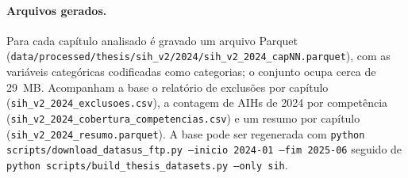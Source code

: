 \paragraph{Arquivos gerados.}
Para cada capítulo analisado é gravado um arquivo Parquet
(\texttt{data/processed/thesis/sih\_v2/2024/sih\_v2\_2024\_capNN.parquet}), com as
variáveis categóricas codificadas como categorias; o conjunto ocupa cerca de
29~MB. Acompanham a base o relatório de exclusões por capítulo
(\texttt{sih\_v2\_2024\_exclusoes.csv}), a contagem de AIHs de 2024 por
competência (\texttt{sih\_v2\_2024\_cobertura\_competencias.csv}) e um resumo por
capítulo (\texttt{sih\_v2\_2024\_resumo.parquet}). A base pode ser regenerada com
\texttt{python scripts/download\_datasus\_ftp.py --inicio 2024-01 --fim 2025-06}
seguido de \texttt{python scripts/build\_thesis\_datasets.py --only sih}.
